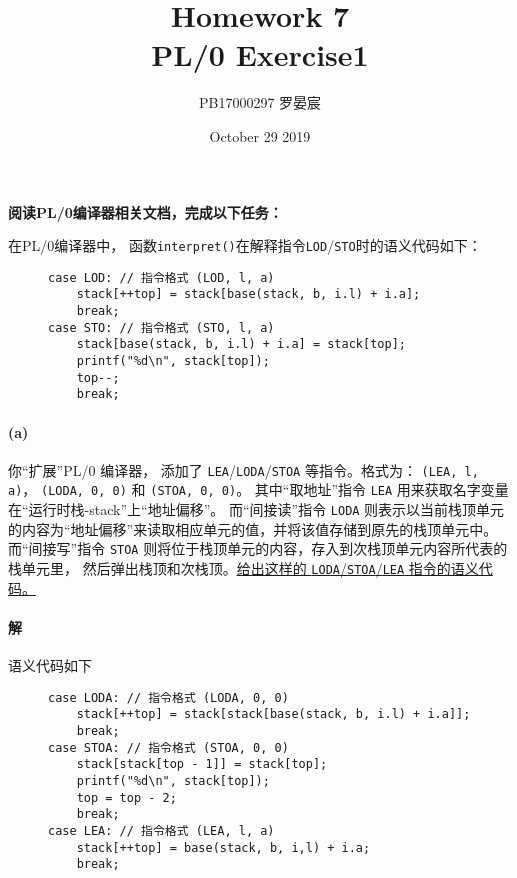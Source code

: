 \documentclass{article}
\title{Homework 7\\ \normalsize PL/0 Exercise1}
\author{PB17000297 罗晏宸}
\date{October 29 2019}
\begin{document}
\maketitle

\textbf{阅读PL/0编译器相关文档，完成以下任务：}\par
在PL/0编译器中， 函数\lstinline{interpret()}在解释指令\texttt{LOD}/\texttt{STO}时的语义代码如下：

\begin{figure}[H]
    \centering
    \begin{lstlisting}[style = C]
case LOD: // 指令格式 (LOD, l, a)
    stack[++top] = stack[base(stack, b, i.l) + i.a];
    break;
case STO: // 指令格式 (STO, l, a)
    stack[base(stack, b, i.l) + i.a] = stack[top];
    printf("%d\n", stack[top]);
    top--;
    break;
    \end{lstlisting}
\end{figure}

\paragraph{(a)}
你“扩展”PL/0 编译器， 添加了 \texttt{LEA}/\texttt{LODA}/\texttt{STOA} 等指令。格式为： \lstinline{(LEA, l, a)}， \lstinline{(LODA, 0, 0)} 和 \lstinline{(STOA, 0, 0)}。 其中“取地址”指令 \texttt{LEA} 用来获取名字变量在“运行时栈-stack”上“地址偏移”。 而“间接读”指令 \texttt{LODA} 则表示以当前栈顶单元的内容为“地址偏移”来读取相应单元的值，并将该值存储到原先的栈顶单元中。而“间接写”指令 \texttt{STOA} 则将位于栈顶单元的内容，存入到次栈顶单元内容所代表的栈单元里， 然后弹出栈顶和次栈顶。\uline{给出这样的 \texttt{LODA}/\texttt{STOA}/\texttt{LEA} 指令的语义代码。}

\paragraph{解}
语义代码如下

\begin{figure}[H]
    \centering
    \begin{lstlisting}[style = C]
case LODA: // 指令格式 (LODA, 0, 0)
    stack[++top] = stack[stack[base(stack, b, i.l) + i.a]];
    break;
case STOA: // 指令格式 (STOA, 0, 0)
    stack[stack[top - 1]] = stack[top];
    printf("%d\n", stack[top]);
    top = top - 2;
    break;
case LEA: // 指令格式 (LEA, l, a)
    stack[++top] = base(stack, b, i,l) + i.a;
    break;
    \end{lstlisting}
\end{figure}
\end{document}
